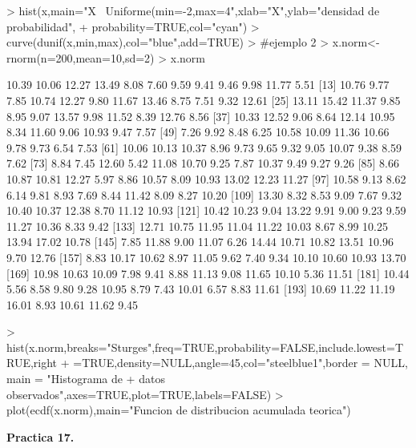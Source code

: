 \documentclass{article}
\begin{document}
\begin{Schunk}
\begin{Sinput}
> hist(x,main="X ~Uniforme(min=-2,max=4",xlab="X",ylab="densidad de probabilidad",
+ probability=TRUE,col="cyan")
> curve(dunif(x,min,max),col="blue",add=TRUE)
> #ejemplo 2
> x.norm<-rnorm(n=200,mean=10,sd=2)
> x.norm
\end{Sinput}
\begin{Soutput}
  [1] 10.39 10.06 12.27 13.49  8.08  7.60  9.59  9.41  9.46  9.98 11.77  5.51
 [13] 10.76  9.77  7.85 10.74 12.27  9.80 11.67 13.46  8.75  7.51  9.32 12.61
 [25] 13.11 15.42 11.37  9.85  8.95  9.07 13.57  9.98 11.52  8.39 12.76  8.56
 [37] 10.33 12.52  9.06  8.64 12.14 10.95  8.34 11.60  9.06 10.93  9.47  7.57
 [49]  7.26  9.92  8.48  6.25 10.58 10.09 11.36 10.66  9.78  9.73  6.54  7.53
 [61] 10.06 10.13 10.37  8.96  9.73  9.65  9.32  9.05 10.07  9.38  8.59  7.62
 [73]  8.84  7.45 12.60  5.42 11.08 10.70  9.25  7.87 10.37  9.49  9.27  9.26
 [85]  8.66 10.87 10.81 12.27  5.97  8.86 10.57  8.09 10.93 13.02 12.23 11.27
 [97] 10.58  9.13  8.62  6.14  9.81  8.93  7.69  8.44 11.42  8.09  8.27 10.20
[109] 13.30  8.32  8.53  9.09  7.67  9.32 10.40 10.37 12.38  8.70 11.12 10.93
[121] 10.42 10.23  9.04 13.22  9.91  9.00  9.23  9.59 11.27 10.36  8.33  9.42
[133] 12.71 10.75 11.95 11.04 11.22 10.03  8.67  8.99 10.25 13.94 17.02 10.78
[145]  7.85 11.88  9.00 11.07  6.26 14.44 10.71 10.82 13.51 10.96  9.70 12.76
[157]  8.83 10.17 10.62  8.97 11.05  9.62  7.40  9.34 10.10 10.60 10.93 13.70
[169] 10.98 10.63 10.09  7.98  9.41  8.88 11.13  9.08 11.65 10.10  5.36 11.51
[181] 10.44  5.56  8.58  9.80  9.28 10.95  8.79  7.43 10.01  6.57  8.83 11.61
[193] 10.69 11.22 11.19 16.01  8.93 10.61 11.62  9.45
\end{Soutput}
\begin{Sinput}
> hist(x.norm,breaks="Sturges",freq=TRUE,probability=FALSE,include.lowest=TRUE,right
+ =TRUE,density=NULL,angle=45,col="steelblue1",border = NULL, main = "Histograma de
+ datos observados",axes=TRUE,plot=TRUE,labels=FALSE)
> plot(ecdf(x.norm),main="Funcion de distribucion acumulada teorica")
\end{Sinput}
\end{Schunk}

\textbf{Practica 17.}
\end{document}

